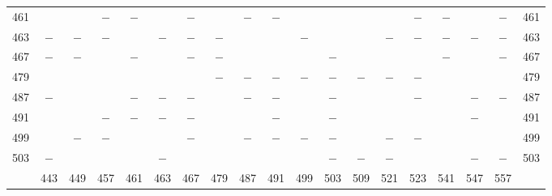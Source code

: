 \begin{center}
\begin{tabular}{r|c|c|c|c|c|c|c|c|c|c|c|c|c|c|c|c|c|r}
461 &  &  & $-$ & $-$ &  & $-$ &  & $-$ & $-$ &  &  &  &  & $-$ & $-$ &  & $-$ & 461\\
463 & $-$ & $-$ & $-$ &  & $-$ & $-$ & $-$ &  &  & $-$ &  &  & $-$ & $-$ & $-$ & $-$ & $-$ & 463\\
467 & $-$ & $-$ &  & $-$ &  & $-$ & $-$ &  &  &  & $-$ &  &  &  & $-$ &  & $-$ & 467\\
479 &  &  &  &  &  &  & $-$ & $-$ & $-$ & $-$ & $-$ & $-$ & $-$ & $-$ &  &  &  & 479\\
487 & $-$ &  &  & $-$ & $-$ & $-$ &  & $-$ & $-$ &  & $-$ &  &  & $-$ &  & $-$ & $-$ & 487\\
491 &  &  & $-$ & $-$ & $-$ & $-$ &  &  & $-$ &  & $-$ &  &  &  &  & $-$ &  & 491\\
499 &  & $-$ & $-$ &  &  & $-$ &  & $-$ & $-$ & $-$ & $-$ &  & $-$ & $-$ &  &  &  & 499\\
503 & $-$ &  &  &  & $-$ &  &  &  &  &  & $-$ & $-$ & $-$ &  &  & $-$ & $-$ & 503\\
\hline
 & 443 & 449 & 457 & 461 & 463 & 467 & 479 & 487 & 491 & 499 & 503 & 509 & 521 & 523 & 541 & 547 & 557 & \\
\hline
\end{tabular}\endgroup\end{center}

